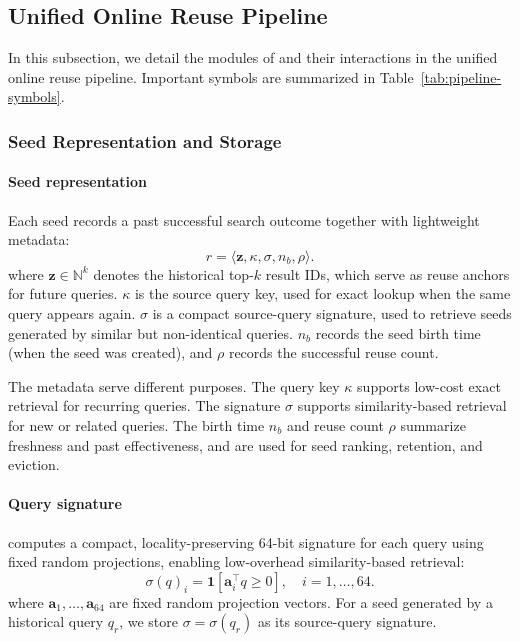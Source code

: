 \subsection{Unified Online Reuse Pipeline}
In this subsection, we detail the modules of \system and their interactions in the unified online reuse pipeline. Important symbols are summarized in Table~\ref{tab:pipeline-symbols}.



\subsubsection{Seed Representation and Storage}

\paragraph{Seed representation}
Each seed records a past successful search outcome together with lightweight metadata:
\begin{equation}
r=\langle \mathbf{z}, \kappa, \sigma, n_b, \rho \rangle .
\end{equation}
where $\mathbf{z}\in\mathbb{N}^k$ denotes the historical top-$k$ result IDs, which serve as reuse anchors for future queries. 
$\kappa$ is the source query key, used for exact lookup when the same query appears again.
$\sigma$ is a compact source-query signature, used to retrieve seeds generated by similar but non-identical queries.
$n_b$ records the seed birth time (when the seed was created), and $\rho$ records the successful reuse count. 

The metadata serve different purposes.
The query key $\kappa$ supports low-cost exact retrieval for recurring queries.
The signature $\sigma$ supports similarity-based retrieval for new or related queries.
The birth time $n_b$ and reuse count $\rho$ summarize freshness and past effectiveness, and are used for seed ranking, retention, and eviction.

\paragraph{Query signature}
\system computes a compact, locality-preserving 64-bit signature for each query using fixed random projections, enabling low-overhead similarity-based retrieval:
\begin{equation}
\sigma(q)_i=\mathbf{1}[\mathbf{a}_i^\top q \ge 0],
\quad i=1,\ldots,64.
\end{equation}
where $\mathbf{a}_1,\ldots,\mathbf{a}_{64}$ are fixed random projection vectors.
For a seed generated by a historical query $q_r$, we store $\sigma=\sigma(q_r)$ as its source-query signature.

